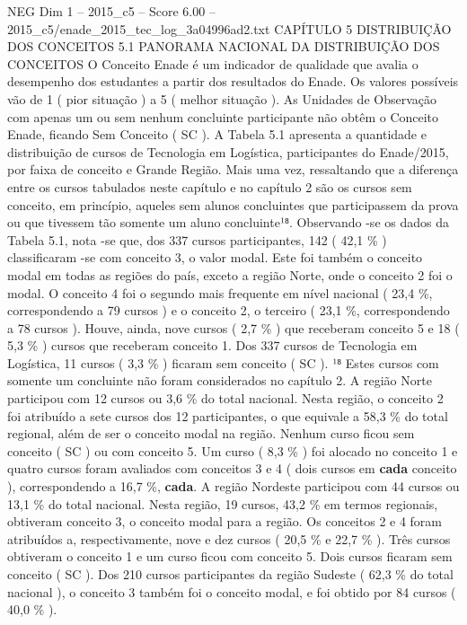 \begin{textsample}{NEG Dim 1 – 2015\_c5 – Score 6.00 – 2015\_c5/enade\_2015\_tec\_log\_3a04996ad2.txt}  \label{ex:f1_neg_342}
CAPÍTULO 5 DISTRIBUIÇÃO DOS CONCEITOS 5.1 PANORAMA NACIONAL DA DISTRIBUIÇÃO DOS CONCEITOS O Conceito Enade é um indicador de qualidade que avalia o desempenho dos estudantes a partir dos resultados do Enade.
Os valores possíveis vão de 1 ( pior situação ) a 5 ( melhor situação ).
As Unidades de Observação com apenas um ou sem nenhum concluinte participante não obtêm o Conceito Enade, ficando Sem Conceito ( SC ).
A Tabela 5.1 apresenta a quantidade e distribuição de cursos de Tecnologia em Logística, participantes do Enade/2015, por faixa de conceito e Grande Região.
Mais uma vez, ressaltando que a diferença entre os cursos tabulados neste capítulo e no capítulo 2 são os cursos sem conceito, em princípio, aqueles sem alunos concluintes que participassem da prova ou que tivessem tão somente um aluno concluinte¹⁸.
Observando -se os dados da Tabela 5.1, nota -se que, dos 337 cursos participantes, 142 ( 42,1 \% ) classificaram -se com conceito 3, o valor modal.
Este foi também o conceito modal em todas as regiões do país, exceto a região Norte, onde o conceito 2 foi o modal.
O conceito 4 foi o segundo mais frequente em nível nacional ( 23,4 \%, correspondendo a 79 cursos ) e o conceito 2, o terceiro ( 23,1 \%, correspondendo a 78 cursos ).
Houve, ainda, nove cursos ( 2,7 \% ) que receberam conceito 5 e 18 ( 5,3 \% ) cursos que receberam conceito 1.
Dos 337 cursos de Tecnologia em Logística, 11 cursos ( 3,3 \% ) ficaram sem conceito ( SC ). ¹⁸ Estes cursos com somente um concluinte não foram considerados no capítulo 2.
A região Norte participou com 12 cursos ou 3,6 \% do total nacional.
Nesta região, o conceito 2 foi atribuído a sete cursos dos 12 participantes, o que equivale a 58,3 \% do total regional, além de ser o conceito modal na região.
Nenhum curso ficou sem conceito ( SC ) ou com conceito 5.
Um curso ( 8,3 \% ) foi alocado no conceito 1 e quatro cursos foram avaliados com conceitos 3 e 4 ( dois cursos em \textbf{cada} conceito ), correspondendo a 16,7 \%, \textbf{cada}.
A região Nordeste participou com 44 cursos ou 13,1 \% do total nacional.
Nesta região, 19 cursos, 43,2 \% em termos regionais, obtiveram conceito 3, o conceito modal para a região.
Os conceitos 2 e 4 foram atribuídos a, respectivamente, nove e dez cursos ( 20,5 \% e 22,7 \% ).
Três cursos obtiveram o conceito 1 e um curso ficou com conceito 5.
Dois cursos ficaram sem conceito ( SC ).
Dos 210 cursos participantes da região Sudeste ( 62,3 \% do total nacional ), o conceito 3 também foi o conceito modal, e foi obtido por 84 cursos ( 40,0 \% ).

\end{textsample}
